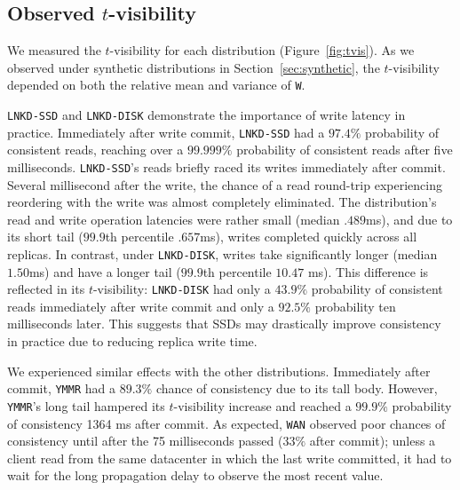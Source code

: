 \documentclass{vldb}
\newcommand{\subsectionskip}{-0em}
\begin{document}
\vspace{\subsectionskip}\subsection{Observed {\large$t$}-visibility}

We measured the $t$-visibility for each distribution
(Figure~\ref{fig:tvis}). As we observed under synthetic distributions
in Section~\ref{sec:synthetic}, the $t$-visibility depended on both
the relative mean and variance of \texttt{W}.

\texttt{LNKD-SSD} and \texttt{LNKD-DISK} demonstrate the importance of
write latency in practice.  Immediately after write commit,
\texttt{LNKD-SSD} had a $97.4\%$ probability of consistent reads,
reaching over a $99.999\%$ probability of consistent reads after five
milliseconds. \texttt{LNKD-SSD}'s reads briefly raced its writes
immediately after commit.  Several millisecond after the write, the
chance of a read round-trip experiencing reordering with the write was
almost completely eliminated. The distribution's read and write
operation latencies were rather small (median $.489$ms), and due to
its short tail ($99.9$th percentile $.657$ms), writes completed
quickly across all replicas.  In contrast, under \texttt{LNKD-DISK},
writes take significantly longer (median $1.50$ms) and have a longer
tail ($99.9$th percentile $10.47$ ms).  This difference is reflected
in its $t$-visibility: \texttt{LNKD-DISK} had only a $43.9\%$
probability of consistent reads immediately after write commit and
only a $92.5\%$ probability ten milliseconds later.  This suggests that
SSDs may drastically improve consistency in practice due to reducing
replica write time.

We experienced similar effects with the other distributions.
Immediately after commit, \texttt{YMMR} had a $89.3\%$ chance of
consistency due to its tall body.  However, \texttt{YMMR}'s long tail
hampered its $t$-visibility increase and reached a $99.9\%$
probability of consistency 1364 ms after commit.  As expected,
\texttt{WAN} observed poor chances of consistency until after the 75
milliseconds passed ($33\%$ after commit); unless a client read from
the same datacenter in which the last write committed, it had to wait
for the long propagation delay to observe the most recent value.
\end{document}
